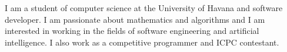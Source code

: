 \documentclass[8pt]{developercv} %
\begin{document}
\vspace{0.5cm}





\begin{minipage}[t]{0.4\textwidth} %
	\vspace{-\baselineskip} %
	
	I am a student of computer science at the University of Havana and software developer. I am passionate
	about mathematics and algorithms and I am interested in working in the fields of software engineering and
	artificial intelligence. I also work as a competitive programmer and ICPC contestant.
\end{minipage}
\hfill %
\begin{minipage}[t]{0.5\textwidth} %
	\vspace{-\baselineskip} %
	\begin{barchart}{5.5}
	\end{barchart}
\end{minipage}

\begin{center}
\end{center}


\end{document}

